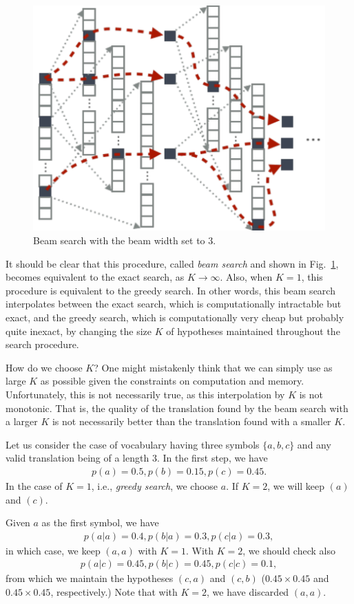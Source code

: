 \documentclass{report}
\begin{document}
\begin{figure}[t]
    \centering
    \centering
    \includegraphics[width=0.7\columnwidth]{figures/beamsearch_k3.pdf}

    \caption{Beam search with the beam width set to $3$.}
    \label{fig:beamsearch}
\end{figure}

It should be clear that this procedure, called {\em beam search} and shown in
Fig.~\ref{fig:beamsearch}, becomes
equivalent to the exact search, as $K\to \infty$. Also, when $K=1$, this
procedure is equivalent to the greedy search. In other words, this beam search
interpolates between the exact search, which is computationally intractable but
exact, and the greedy search, which is computationally very cheap but probably
quite inexact, by changing the size $K$ of hypotheses maintained throughout the
search procedure. 

How do we choose $K$? One might mistakenly think that we can simply use as large
$K$ as possible given the constraints on computation and memory. Unfortunately,
this is not necessarily true, as this interpolation by $K$ is not monotonic.
That is, the quality of the translation found by the beam search with a larger
$K$ is not necessarily better than the translation found with a smaller $K$.

Let us consider the case of vocabulary having three symbols $\{ a, b, c\}$ and
any valid translation being of a length $3$. In the first step, we have
\begin{align*}
    p(a) = 0.5, p(b) = 0.15, p(c) = 0.45.
\end{align*}
In the case of $K=1$, i.e., {\em greedy search}, we choose $a$. If $K=2$, we
will keep $(a)$ and $(c)$. 

Given $a$ as the first symbol, we have
\begin{align*}
    p(a|a) = 0.4, p(b|a) = 0.3, p(c|a) = 0.3,
\end{align*}
in which case, we keep $(a,a)$ with $K=1$. With $K=2$, we should check also
\begin{align*}
    p(a|c) = 0.45, p(b|c) = 0.45, p(c|c) = 0.1,
\end{align*}
from which we maintain the hypotheses $(c,a)$ and $(c,b)$ ($0.45 \times 0.45$
and $0.45 \times 0.45$, respectively.) Note that with $K=2$,
we have discarded $(a,a)$.
\end{document}
